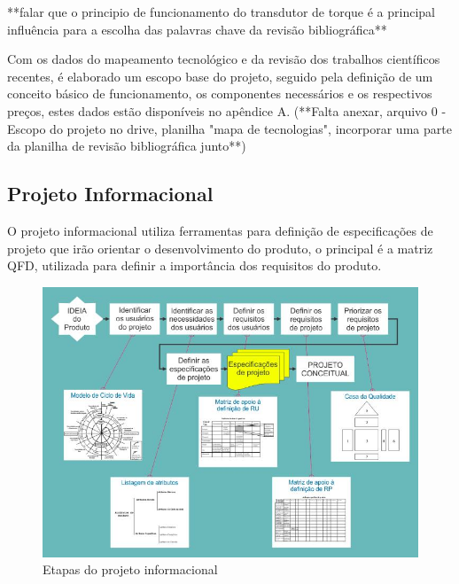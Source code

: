 **falar que o principio de funcionamento do transdutor de torque é a principal influência para a escolha das palavras chave da revisão bibliográfica**


Com os dados do mapeamento tecnológico e da revisão dos trabalhos científicos recentes, é elaborado um escopo base do projeto, seguido pela definição de um conceito básico de funcionamento, os componentes necessários e os respectivos preços, estes dados estão disponíveis no apêndice A. (**Falta anexar, arquivo 0 - Escopo do projeto no drive, planilha "mapa de tecnologias", incorporar uma parte da planilha de revisão bibliográfica junto**)

\subsection{Projeto Informacional}

O projeto informacional utiliza ferramentas para definição de especificações de projeto que irão orientar o desenvolvimento do produto, o principal é a matriz QFD, utilizada para definir a importância dos requisitos do produto.

\begin{figure}[htb]
	\caption{\label{fig:Fig_401}Etapas do projeto informacional}
	\begin{center}
		\includegraphics[width=\textwidth]{images/img402.jpg}
	\end{center}
\end{figure}


